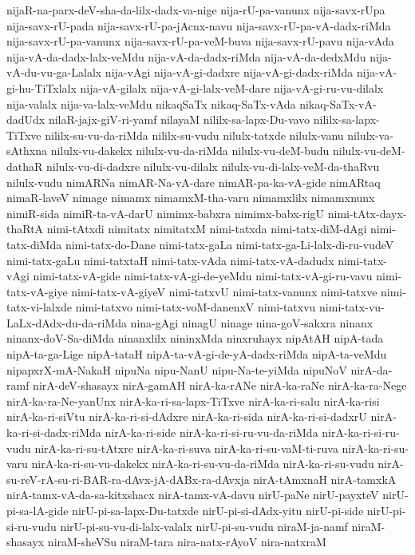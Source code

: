 {nijaR-na-parx-deV-sha-da-lilx-dadx-va-nige
nija-rU-pa-vanunx
nija-savx-rUpa
nija-savx-rU-pada
nija-savx-rU-pa-jAcnx-navu
nija-savx-rU-pa-vA-dadx-riMda
nija-savx-rU-pa-vanunx
nija-savx-rU-pa-veM-buva
nija-savx-rU-pavu
nija-vAda
nija-vA-da-dadx-lalx-veMdu
nija-vA-da-dadx-riMda
nija-vA-da-dedxMdu
nija-vA-du-vu-ga-Lalalx
nija-vAgi
nija-vA-gi-dadxre
nija-vA-gi-dadx-riMda
nija-vA-gi-hu-TiTxlalx
nija-vA-gilalx
nija-vA-gi-lalx-veM-dare
nija-vA-gi-ru-vu-dilalx
nija-valalx
nija-va-lalx-veMdu
nikaqSaTx
nikaq-SaTx-vAda
nikaq-SaTx-vA-dadUdx
nilaR-jajx-giV-ri-yamf
nilayaM
nililx-sa-lapx-Du-vavo
nililx-sa-lapx-TiTxve
nililx-su-vu-da-riMda
nililx-su-vudu
nilulx-tatxde
nilulx-vanu
nilulx-va-sAthxna
nilulx-vu-dakekx
nilulx-vu-da-riMda
nilulx-vu-deM-budu
nilulx-vu-deM-dathaR
nilulx-vu-di-dadxre
nilulx-vu-dilalx
nilulx-vu-di-lalx-veM-da-thaRvu
nilulx-vudu
nimARNa
nimAR-Na-vA-dare
nimAR-pa-ka-vA-gide
nimARtaq
nimaR-laveV
nimage
nimamx
nimamxM-tha-varu
nimamxlilx
nimamxnunx
nimiR-sida
nimiR-ta-vA-darU
nimimx-babxra
nimimx-babx-rigU
nimi-tAtx-dayx-thaRtA
nimi-tAtxdi
nimitatx
nimitatxM
nimi-tatxda
nimi-tatx-diM-dAgi
nimi-tatx-diMda
nimi-tatx-do-Dane
nimi-tatx-gaLa
nimi-tatx-ga-Li-lalx-di-ru-vudeV
nimi-tatx-gaLu
nimi-tatxtaH
nimi-tatx-vAda
nimi-tatx-vA-dadudx
nimi-tatx-vAgi
nimi-tatx-vA-gide
nimi-tatx-vA-gi-de-yeMdu
nimi-tatx-vA-gi-ru-vavu
nimi-tatx-vA-giye
nimi-tatx-vA-giyeV
nimi-tatxvU
nimi-tatx-vanunx
nimi-tatxve
nimi-tatx-vi-lalxde
nimi-tatxvo
nimi-tatx-voM-danenxV
nimi-tatxvu
nimi-tatx-vu-LaLx-dAdx-du-da-riMda
nina-gAgi
ninagU
ninage
nina-goV-sakxra
ninanx
ninanx-doV-Sa-diMda
ninanxlilx
nininxMda
ninxruhayx
nipAtAH
nipA-tada
nipA-ta-ga-Lige
nipA-tataH
nipA-ta-vA-gi-de-yA-dadx-riMda
nipA-ta-veMdu
nipapxrX-mA-NakaH
nipuNa
nipu-NanU
nipu-Na-te-yiMda
nipuNoV
nirA-da-ramf
nirA-deV-shasayx
nirA-gamAH
nirA-ka-rANe
nirA-ka-raNe
nirA-ka-ra-Nege
nirA-ka-ra-Ne-yanUnx
nirA-ka-ri-sa-lapx-TiTxve
nirA-ka-ri-salu
nirA-ka-risi
nirA-ka-ri-siVtu
nirA-ka-ri-si-dAdxre
nirA-ka-ri-sida
nirA-ka-ri-si-dadxrU
nirA-ka-ri-si-dadx-riMda
nirA-ka-ri-side
nirA-ka-ri-si-ru-vu-da-riMda
nirA-ka-ri-si-ru-vudu
nirA-ka-ri-su-tAtxre
nirA-ka-ri-suva
nirA-ka-ri-su-vaM-ti-ruva
nirA-ka-ri-su-varu
nirA-ka-ri-su-vu-dakekx
nirA-ka-ri-su-vu-da-riMda
nirA-ka-ri-su-vudu
nirA-su-reV-rA-su-ri-BAR-ra-dAvx-jA-dABx-ra-dAvxja
nirA-tAmxnaH
nirA-tamxkA
nirA-tamx-vA-da-sa-kitxshacx
nirA-tamx-vA-davu
nirU-paNe
nirU-payxteV
nirU-pi-sa-lA-gide
nirU-pi-sa-lapx-Du-tatxde
nirU-pi-si-dAdx-yitu
nirU-pi-side
nirU-pi-si-ru-vudu
nirU-pi-su-vu-di-lalx-valalx
nirU-pi-su-vudu
niraM-ja-namf
niraM-shasayx
niraM-sheVSu
niraM-tara
nira-natx-rAyoV
nira-natxraM
}
